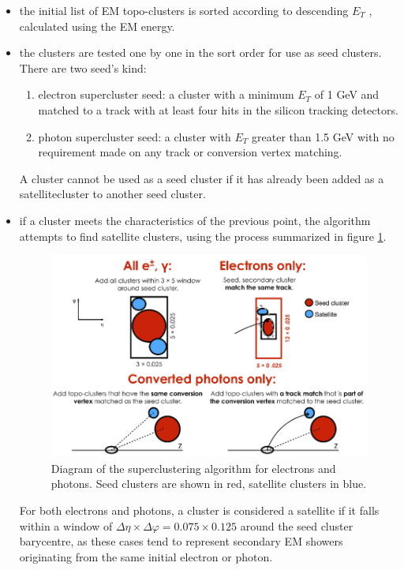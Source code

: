 \documentclass[a4paper, oneside]{book}
\begin{document}
		\begin{itemize}
		\item the initial list of EM topo-clusters is
		sorted according to descending $E_T$ , calculated using the EM energy.
		\item the clusters are tested one by one in the sort order for use as seed clusters. There are two seed's kind:
			\begin{enumerate}[label=\roman*.]
				\item electron supercluster seed: a cluster with a minimum $E_T$ of 1 GeV and matched to a track with at least four hits in the silicon tracking detectors.
				\item photon supercluster seed: a cluster with $E_T$ greater
				than 1.5 GeV with no requirement made on any track or conversion
				vertex matching.
			\end{enumerate}
		A cluster cannot be used as a seed cluster if it has already been added as a satellitecluster to another seed cluster.
		\item if a cluster meets the characteristics of the previous point, the algorithm attempts to find satellite clusters, using the process summarized in figure \ref{fig:super_cl}.
		\begin{figure}
			\centering
			\includegraphics[width=0.45\textheight]{tesi_images/super_cluster.png}
			\caption{Diagram of the superclustering algorithm for electrons and photons. Seed clusters are shown in
			red, satellite clusters in blue.}
			\label{fig:super_cl}
		\end{figure}
		For both electrons and photons, a cluster is considered a satellite if it falls within a window of $\Delta\eta \times \Delta\varphi = 0.075 \times 0.125$ around the seed cluster barycentre, as these cases tend to represent secondary EM showers originating from the same initial electron or photon.

\end{itemize}
\end{document}
